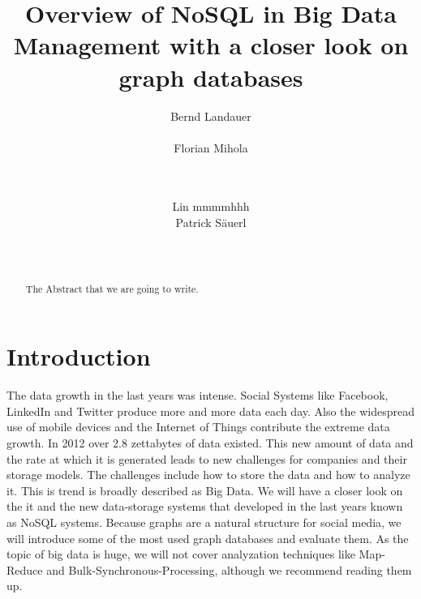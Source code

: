 \documentclass{acm_proc_article-sp}
\begin{document}
\title{Overview of NoSQL in Big Data Management with a closer look on graph databases }

\author{
\alignauthor
Bernd Landauer\\
       \\
\alignauthor 
Florian Mihola\\
	\\
	\\
\and
\alignauthor Lin mmmmhhh
       \\
\alignauthor Patrick S{\"a}uerl\\
       \\
       \\
}


\maketitle
\begin{abstract}
The Abstract that we are going to write.
\end{abstract}

\section{Introduction}

The data growth in the last years was intense. Social Systems like Facebook, LinkedIn and Twitter produce more and more data each day. Also the widespread use of mobile devices and the Internet of Things contribute the extreme data growth. In 2012 over 2.8 zettabytes of data existed. This new amount of data and the rate at which it is generated leads to new challenges for companies and their storage models. The challenges include how to store the data and how to analyze it. This is trend is broadly described as Big Data. We will have a closer look on the it and the new data-storage systems that developed in the last years known as NoSQL systems. Because graphs are a natural structure for social media, we will introduce some of the most used graph databases and evaluate them. As the topic of big data is huge, we will not cover analyzation techniques like Map-Reduce and Bulk-Synchronous-Processing, although we recommend reading them up.
\end{document}
